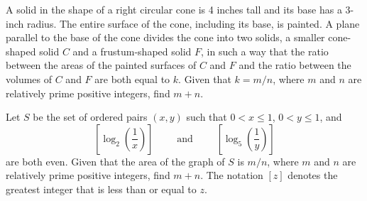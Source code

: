 \documentclass[11pt]{article}
\theoremstyle{definition}
\begin{document}
%	





















\begin{question}[name={2004 AIME I, \href{https://artofproblemsolving.com/community/c4p378108}{Problem 11}}]
	A solid in the shape of a right circular cone is 4 inches tall and its base has a 3-inch radius. The entire surface of the cone, including its base, is painted. A plane parallel to the base of the cone divides the cone into two solids, a smaller cone-shaped solid $C$ and a frustum-shaped solid $F$, in such a way that the ratio between the areas of the painted surfaces of $C$ and $F$ and the ratio between the volumes of $C$ and $F$ are both equal to $k$. Given that $k=m/n$, where $m$ and $n$ are relatively prime positive integers, find $m+n$.
\end{question}


%	












\begin{question}[name={2004 AIME I, \href{https://artofproblemsolving.com/community/c4p378123}{Problem 12}}]
	Let $S$ be the set of ordered pairs $(x, y)$ such that $0<x\le 1$, $0<y\le 1$, and $$\left[\log_2{\left(\frac 1x\right)}\right] \qquad \text{ and } \qquad \left[\log_5{\left(\frac 1y\right)}\right]$$ are both even. Given that the area of the graph of $S$ is $m/n$, where $m$ and $n$ are relatively prime positive integers, find $m+n$. The notation $[z]$ denotes the greatest integer that is less than or equal to $z$.
\end{question}


%	
\end{document}
